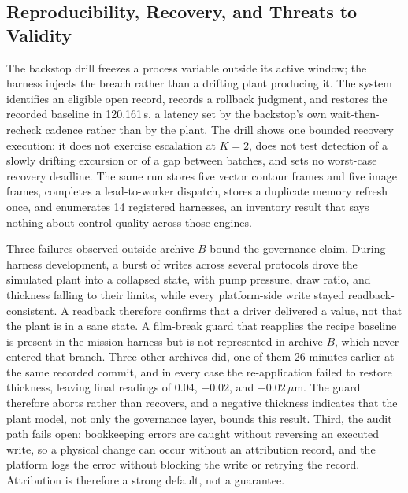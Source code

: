 \subsection{Reproducibility, Recovery, and Threats to Validity}
\label{sec:e1a}
\label{sec:repro}
The backstop drill freezes a process variable outside its active window; the harness
injects the breach rather than a drifting plant producing it. The system identifies
an eligible open record, records a rollback judgment, and restores the recorded
baseline in 120.161\,s, a latency set by the backstop's own wait-then-recheck cadence
rather than by the plant. The drill shows one bounded recovery execution: it does
not exercise escalation at $K=2$, does not test detection of a slowly drifting
excursion or of a gap between batches, and sets no worst-case recovery deadline. The
same run stores five vector contour frames and five image frames, completes a
lead-to-worker dispatch, stores a duplicate memory refresh once, and enumerates 14 registered
harnesses, an inventory result that says nothing about control quality across those
engines.

Three failures observed outside archive $B$ bound the governance claim. During harness
development, a burst of writes across several protocols drove the simulated plant
into a collapsed state, with pump pressure, draw ratio, and thickness falling to
their limits, while every platform-side write stayed readback-consistent. A readback
therefore confirms that a driver delivered a value, not that the plant is in a sane
state. A film-break guard that reapplies the recipe baseline is present in the mission harness but is not represented in archive $B$, which never entered that branch. Three other archives did, one of them 26 minutes earlier at the same recorded commit, and in every case the re-application failed to restore thickness, leaving final readings of $0.04$, $-0.02$, and $-0.02\,\mu$m. The guard therefore aborts rather than recovers, and a negative thickness indicates that the plant model, not only the governance layer, bounds this result. Third, the audit path fails open: bookkeeping errors are caught without reversing an executed write,
so a physical change can occur without an attribution record, and the platform logs
the error without blocking the write or retrying the record. Attribution is
therefore a strong default, not a guarantee.

